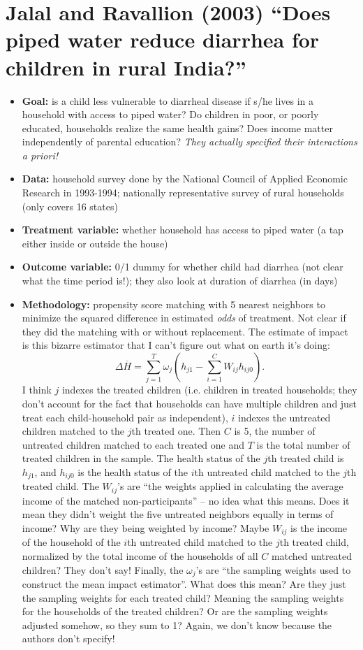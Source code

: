 \documentclass[10pt,a4paper]{article}
\begin{document}
\section*{Jalal and Ravallion (2003) ``Does piped water reduce diarrhea for children in rural India?''}
\begin{itemize}
	\item \textbf{Goal:} is a child less vulnerable to diarrheal disease if s/he lives in a household with access to piped water? Do children in poor, or poorly educated, households realize the same health gains? Does income matter independently of parental education? \textit{They actually specified their interactions a priori!}
	\item \textbf{Data:} household survey done by the National Council of Applied Economic Research in 1993-1994; nationally representative survey of rural households (only covers 16 states)
	\item \textbf{Treatment variable:} whether household has access to piped water (a tap either inside or outside the house)
	\item \textbf{Outcome variable:} 0/1 dummy for whether child had diarrhea (not clear what the time period is!); they also look at duration of diarrhea (in days)
	\item \textbf{Methodology:} propensity score matching with 5 nearest neighbors to minimize the squared difference in estimated \textit{odds} of treatment. Not clear if they did the matching with or without replacement. The estimate of impact is this bizarre estimator that I can't figure out what on earth it's doing:
		\[
			\Delta \overline{H} = \sum_{j=1}^T \omega_j \left( h_{j1} - \sum_{i=1}^C W_{ij} h_{ij0} \right).
		\]
		I think $j$ indexes the treated children (i.e. children in treated households; they don't account for the fact that households can have multiple children and just treat each child-household pair as independent), $i$ indexes the untreated children matched to the $j$th treated one. Then $C$ is 5, the number of untreated children matched to each treated one and $T$ is the total number of treated children in the sample. The health status of the $j$th treated child is $h_{j1}$, and $h_{ij0}$ is the health status of the $i$th untreated child matched to the $j$th treated child. The $W_{ij}$'s are ``the weights applied in calculating the average income of the matched non-participants'' -- no idea what this means. Does it mean they didn't weight the five untreated neighbors equally in terms of income? Why are they being weighted by income? Maybe $W_{ij}$ is the income of the household of the $i$th untreated child matched to the $j$th treated child, normalized by the total income of the households of all $C$ matched untreated children? They don't say! Finally, the $\omega_{j}$'s are ``the sampling weights used to construct the mean impact estimator''. What does this mean? Are they just the sampling weights for each treated child? Meaning the sampling weights for the households of the treated children? Or are the sampling weights adjusted somehow, so they sum to 1? Again, we don't know because the authors don't specify!

\end{itemize}
\end{document}
